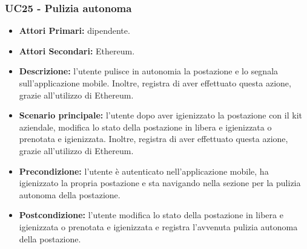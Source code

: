 \subsubsection{ UC25 - Pulizia autonoma}
\begin{itemize}
	\item\textbf{Attori Primari:} dipendente.
	\item\textbf{Attori Secondari:} Ethereum.
	\item\textbf{Descrizione:} l’utente pulisce in autonomia la postazione e lo segnala sull'applicazione mobile. Inoltre, 
	registra di aver effettuato questa azione, grazie all'utilizzo di Ethereum.	
	\item\textbf{Scenario principale:} l’utente dopo aver igienizzato la postazione con il kit aziendale, modifica lo stato della postazione in libera e igienizzata o prenotata e igienizzata. Inoltre, registra di aver effettuato questa azione, grazie all'utilizzo di Ethereum.
	\item\textbf{Precondizione:} l’utente è autenticato nell'applicazione mobile, ha igienizzato la propria postazione e sta navigando nella sezione per la pulizia 
	autonoma della postazione.
	\item\textbf{Postcondizione:} l’utente modifica lo stato della postazione in libera e igienizzata o prenotata e igienizzata e registra l'avvenuta pulizia autonoma della postazione.
\end{itemize}


